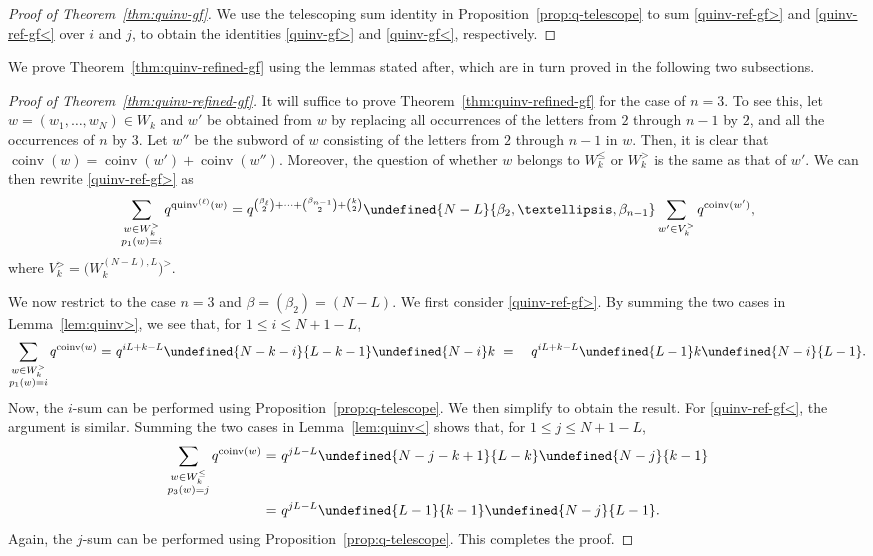 \documentclass[11pt]{article}
\theoremstyle{definition}
\providecommand{\qbinom}[2]{\genfrac{[}{]}{0pt}{}{#1}{#2}}
\numberwithin{equation}{section}
\DeclareMathOperator{\coinv}{coinv}
\DeclareMathOperator{\quinvL}{\quinv^{(\ell)}}
\DeclareMathOperator{\quinv}{quinv}
\let\qbinom\undefined
\newcommand{\qbinom}[2]{\bgroup\renewcommand*{\arraystretch}{1}\begin{bmatrix} #1 \\ #2\end{bmatrix} \egroup}
\begin{document}
\begin{proof}[Proof of Theorem~\ref{thm:quinv-gf}]
We use the telescoping sum identity in Proposition~\ref{prop:q-telescope} to sum \eqref{quinv-ref-gf>} and \eqref{quinv-ref-gf<} over $i$ and $j$, to obtain the identities \eqref{quinv-gf>} and \eqref{quinv-gf<}, respectively.
\end{proof} 
We prove Theorem~\ref{thm:quinv-refined-gf} using the lemmas stated after, which are in turn
proved in the following two subsections. 
\begin{proof}[Proof of Theorem~\ref{thm:quinv-refined-gf}]
It will suffice to prove Theorem~\ref{thm:quinv-refined-gf} for the case of $n=3$. 
To see this, let $w = (w_1, \dots, w_N) \in W_k$ and $w'$ be obtained from $w$ by replacing all
occurrences of the letters from $2$ through $n-1$ by $2$, and all the occurrences of $n$ by $3$.
Let $w''$ be the subword of $w$ consisting of the letters from $2$ through $n-1$ in $w$. 
Then, it is clear that $\coinv(w) = \coinv(w') + \coinv(w'')$.  Moreover, the question of whether $w$
belongs to $W_k^\leq$ or $W_k^>$ is the same as that of $w'$. 
We can then rewrite \eqref{quinv-ref-gf>} as
\[
\sum_{\substack{ w \in W_k^> \\ p_1(w) = i}} q^{\quinvL(w)} =
q^{\binom{\beta_\ell}{2} + \cdots + \binom{\beta_{n-1}}{2} + \binom{k}{2}} 
\qbinom{N-L}{\beta_2,\dots,\beta_{n-1}}
\sum_{w'\in V_k^{>}} q^{\coinv(w')},
\]
where $V_k^> = \big(W^{(N-L),L}_k \big)^>$.


We now restrict to the case $n=3$ and $\beta = (\beta_2) = (N-L)$. 
We first consider \eqref{quinv-ref-gf>}.
By summing the two cases in Lemma~\ref{lem:quinv>}, we see that, for $1 \leq i \leq N +1 - L$,
\begin{align*}
\sum_{\substack{ w \in W_k^> \\ p_1(w) = i}} q^{\coinv(w)} 
=&\ q^{ iL + k - L} \qbinom{N-k-i}{L-k-1} \qbinom {N-i}k \
=&\ q^{ iL + k - L}  \qbinom{L-1}k \qbinom{N-i}{L-1}.
\end{align*}
Now, the $i$-sum can be performed using Proposition~\ref{prop:q-telescope}. We then simplify to obtain the result.
For \eqref{quinv-ref-gf<}, the argument is similar. Summing the two cases in Lemma~\ref{lem:quinv<}
shows that, for $1 \leq j \leq N +1 - L$,
\begin{align*}
\sum_{\substack{ w \in W_k^\leq \\ p_3(w) = j}} q^{\coinv(w)} 
=&\ q^{ j L - L} \qbinom{N-j-k+1}{L-k} \qbinom {N-j}{k-1} \\
=&\ q^{ j L - L} \qbinom{L-1}{k-1} \qbinom{N-j}{L-1}.
\end{align*}
Again, the $j$-sum can be performed using Proposition~\ref{prop:q-telescope}. This completes the proof.
\end{proof}
\end{document}
